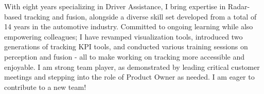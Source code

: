 

\begin{cvparagraph}
    With eight years specializing in Driver Assistance, I bring expertise in Radar-based
    tracking and fusion, alongside a diverse skill set developed from a total of 14 years in the automotive industry.
    Committed to ongoing learning while also empowering colleagues; I have revamped visualization tools, introduced two generations of tracking KPI tools, and conducted various training sessions on perception and fusion - all to make working on tracking more accessible and enjoyable. I am strong team player, as demonstrated by leading critical customer meetings and stepping into the role of Product Owner as needed. I am eager to contribute to a new team!

\end{cvparagraph}
